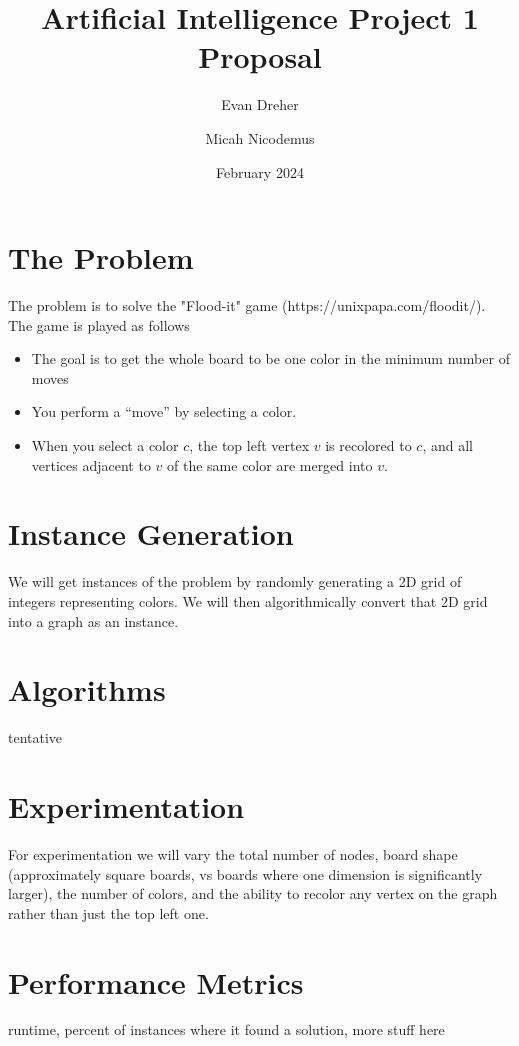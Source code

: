 \documentclass{article}
\author{
    Evan Dreher \\
    \and
    Micah Nicodemus
}
\title{Artificial Intelligence Project 1 Proposal}
\date{February 2024}
\begin{document}
\maketitle

\section{The Problem}
\par The problem is to solve the "Flood-it" game (https://unixpapa.com/floodit/). The game is played as follows
\begin{itemize}
    \item The goal is to get the whole board to be one color in the minimum number of moves
    \item You perform a ``move'' by selecting a color.
    \item When you select a color $c$, the top left vertex $v$ is recolored to $c$, and all vertices adjacent to $v$ of the same color are merged into $v$. 
\end{itemize}

\section{Instance Generation}
\par We will get instances of the problem by randomly generating a 2D grid of integers representing colors. We will then algorithmically convert that 2D grid into a graph as an instance.

\section{Algorithms}
\par tentative

\section{Experimentation}
\par For experimentation we will vary the total number of nodes, board shape (approximately square boards, vs boards where one dimension is significantly larger), the number of colors, and the ability to recolor any vertex on the graph rather than just the top left one.

\section{Performance Metrics}
\par runtime, percent of instances where it found a solution, more stuff here
\end{document}
